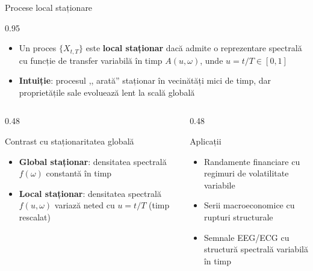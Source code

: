 \documentclass[9pt, aspectratio=169, t]{beamer}
\begin{document}
\begin{frame}{Procese local staționare}
    \begin{cminipage}{0.95\textwidth}
        \vspace{-0.2cm}
        {\footnotesize
        \begin{defn}
            \begin{itemize}\setlength{\itemsep}{0pt}
                \item Un proces $\{X_{t,T}\}$ este \textbf{local staționar} dacă admite o reprezentare spectrală cu funcție de transfer variabilă în timp $A(u,\omega)$, unde $u = t/T \in [0,1]$
                \item \textbf{Intuiție}: procesul ,, arată'' staționar în vecinătăți mici de timp, dar proprietățile sale evoluează lent la scală globală
            \end{itemize}
        \end{defn}
        }
        \vspace{-2mm}
        {\footnotesize
        \begin{columns}[T]
            \begin{column}{0.48\textwidth}
                \begin{block}{Contrast cu staționaritatea globală}
                    \begin{itemize}\setlength{\itemsep}{0pt}
                        \item \textbf{Global staționar}: densitatea spectrală $f(\omega)$ constantă în timp
                        \item \textbf{Local staționar}: densitatea spectrală $f(u,\omega)$ variază neted cu $u = t/T$ (timp rescalat)
                    \end{itemize}
                \end{block}
            \end{column}
            \begin{column}{0.48\textwidth}
                \begin{exampleblock}{Aplicații}
                    \begin{itemize}\setlength{\itemsep}{0pt}
                        \item Randamente financiare cu regimuri de volatilitate variabile
                        \item Serii macroeconomice cu rupturi structurale
                        \item Semnale EEG/ECG cu structură spectrală variabilă în timp
                    \end{itemize}
                \end{exampleblock}
            \end{column}
        \end{columns}
        }
        \hfill{}
    \end{cminipage}
\end{frame}
\end{document}
